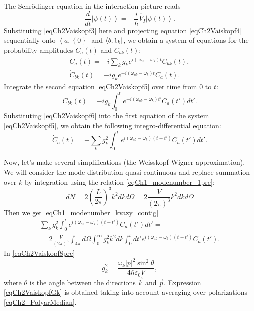 The Schrödinger equation in the interaction picture reads
\begin{equation}
\frac{d}{dt} \left|\psi\left(t\right)\right> =
- \frac{i}{\hbar} \hat{V}_I \left|\psi\left(t\right)\right>.
\label{eqCh2Vaiskopf4}
\end{equation}
Substituting \eqref{eqCh2Vaiskopf3} here and projecting equation
\eqref{eqCh2Vaiskopf4} sequentially onto
$\left<a, \left\{0\right\}\right|$ and $\bra{b, 1_k}$, we obtain
a system of equations for the probability amplitudes 
$C_{a}\left(t\right)$ and $C_{bk}\left(t\right)$:
\begin{eqnarray}
\dot{C}_{a}\left(t\right) = - i \sum_{k} g_k e^{i \left(\omega_{ab} - 
  \omega_k\right)t} C_{bk}\left(t\right),
\nonumber \\
\dot{C}_{bk}\left(t\right) = - i g_k e^{- i \left(\omega_{ab} -
  \omega_k\right)t} C_{a}\left(t\right).
\label{eqCh2Vaiskopf5}
\end{eqnarray}
Integrate the second equation \eqref{eqCh2Vaiskopf5} over time from $0$ to
$t$: 
\begin{equation}
C_{bk}\left(t\right) = - i g_k \int_0^{t} e^{- i \left(\omega_{ab} -
  \omega_k\right)t'} C_{a}\left(t'\right) dt'.
\label{eqCh2Vaiskopf6}
\end{equation}
Substituting \eqref{eqCh2Vaiskopf6} into the first equation of the system
\eqref{eqCh2Vaiskopf5}, we obtain the following integro-differential
equation:
\begin{equation}
\dot{C}_{a}\left(t\right) = - \sum_{k} g_k^2 
\int_0^t
e^{i \left(\omega_{ab} - \omega_k\right)\left(t - t'\right)}  
C_{a}\left(t'\right) dt'.
\label{eqCh2Vaiskopf7}
\end{equation}

Now, let's make several simplifications (the Weisskopf-Wigner approximation).
We will consider the mode distribution quasi-continuous and replace summation over
$k$ by integration using the relation
\eqref{eqCh1_modenumber_1pre}:
\begin{equation}
d N = 2 \left(\frac{L}{2 \pi} \right)^3 k^2 d k d \Omega = 
2 \frac{V}{\left(2 \pi\right)^3}  k^2 d k d \Omega
\nonumber
\end{equation}
Then we get \eqref{eqCh1_modenumber_kvazy_contig}
\begin{eqnarray}
\sum_{k} g_k^2 
\int_0^t
e^{i \left(\omega_{ab} - \omega_k\right)\left(t - t'\right)}  
C_{a}\left(t'\right) dt' = 
\nonumber \\
= 2 \frac{V}{\left(2 \pi\right)^3} \int_{4\pi}d \Omega \int_0^{\infty}
g_k^2 k^2 dk  \int_0^t dt'
e^{i \left(\omega_{ab} - \omega_k\right)\left(t - t'\right)}  
C_{a}\left(t'\right).
\label{eqCh2Vaiskopf8pre}
\end{eqnarray}
In \eqref{eqCh2Vaiskopf8pre} 
\begin{equation}
g_k^2 = \frac{\omega_k\left|p\right|^2 \sin^2 \theta}{4 \hbar
  \varepsilon_0 V},
\label{eqCh2VaiskopfGk}
\end{equation}
where $\theta$ is the angle between the directions $\vec{k}$ and $\vec{p}$.
Expression \eqref{eqCh2VaiskopfGk} is obtained taking into account averaging over
polarizations \eqref{eqCh2_PolyarMedian}.

